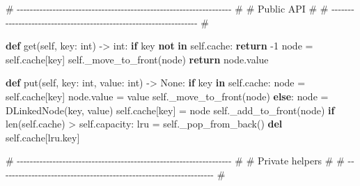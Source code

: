 \documentclass[11pt]{article}
\newenvironment{Shaded}{\begin{snugshade}}{\end{snugshade}}
\newcommand{\BuiltInTok}[1]{\textcolor[rgb]{0.50,0.55,0.55}{#1}}
\newcommand{\CommentTok}[1]{\textcolor[rgb]{0.48,0.49,0.49}{#1}}
\newcommand{\ControlFlowTok}[1]{\textcolor[rgb]{0.99,0.74,0.29}{\textbf{#1}}}
\newcommand{\DecValTok}[1]{\textcolor[rgb]{0.96,0.45,0.00}{#1}}
\newcommand{\KeywordTok}[1]{\textcolor[rgb]{0.81,0.81,0.76}{\textbf{#1}}}
\newcommand{\NormalTok}[1]{\textcolor[rgb]{0.81,0.81,0.76}{#1}}
\newcommand{\OperatorTok}[1]{\textcolor[rgb]{0.81,0.81,0.76}{#1}}
\newcommand{\VariableTok}[1]{\textcolor[rgb]{0.15,0.68,0.68}{#1}}
\begin{document}
\begin{Shaded}
\begin{Highlighting}[]
    \CommentTok{\# {-}{-}{-}{-}{-}{-}{-}{-}{-}{-}{-}{-}{-}{-}{-}{-}{-}{-}{-}{-}{-}{-}{-}{-}{-}{-}{-}{-}{-}{-}{-}{-}{-}{-}{-}{-}{-}{-}{-}{-}{-}{-}{-}{-}{-}{-}{-}{-}{-}{-}{-}{-}{-}{-}{-}{-}{-}{-}{-}{-}{-}{-}{-}{-}{-}{-} \#}
    \CommentTok{\# Public API                                                           \#}
    \CommentTok{\# {-}{-}{-}{-}{-}{-}{-}{-}{-}{-}{-}{-}{-}{-}{-}{-}{-}{-}{-}{-}{-}{-}{-}{-}{-}{-}{-}{-}{-}{-}{-}{-}{-}{-}{-}{-}{-}{-}{-}{-}{-}{-}{-}{-}{-}{-}{-}{-}{-}{-}{-}{-}{-}{-}{-}{-}{-}{-}{-}{-}{-}{-}{-}{-}{-}{-} \#}

    \KeywordTok{def}\NormalTok{ get(}\VariableTok{self}\NormalTok{, key: }\BuiltInTok{int}\NormalTok{) }\OperatorTok{{-}\textgreater{}} \BuiltInTok{int}\NormalTok{:}
        \ControlFlowTok{if}\NormalTok{ key }\KeywordTok{not} \KeywordTok{in} \VariableTok{self}\NormalTok{.cache:}
            \ControlFlowTok{return} \OperatorTok{{-}}\DecValTok{1}
\NormalTok{        node }\OperatorTok{=} \VariableTok{self}\NormalTok{.cache[key]}
        \VariableTok{self}\NormalTok{.\_move\_to\_front(node)}
        \ControlFlowTok{return}\NormalTok{ node.value}

    \KeywordTok{def}\NormalTok{ put(}\VariableTok{self}\NormalTok{, key: }\BuiltInTok{int}\NormalTok{, value: }\BuiltInTok{int}\NormalTok{) }\OperatorTok{{-}\textgreater{}} \VariableTok{None}\NormalTok{:}
        \ControlFlowTok{if}\NormalTok{ key }\KeywordTok{in} \VariableTok{self}\NormalTok{.cache:}
\NormalTok{            node }\OperatorTok{=} \VariableTok{self}\NormalTok{.cache[key]}
\NormalTok{            node.value }\OperatorTok{=}\NormalTok{ value}
            \VariableTok{self}\NormalTok{.\_move\_to\_front(node)}
        \ControlFlowTok{else}\NormalTok{:}
\NormalTok{            node }\OperatorTok{=}\NormalTok{ DLinkedNode(key, value)}
            \VariableTok{self}\NormalTok{.cache[key] }\OperatorTok{=}\NormalTok{ node}
            \VariableTok{self}\NormalTok{.\_add\_to\_front(node)}
            \ControlFlowTok{if} \BuiltInTok{len}\NormalTok{(}\VariableTok{self}\NormalTok{.cache) }\OperatorTok{\textgreater{}} \VariableTok{self}\NormalTok{.capacity:}
\NormalTok{                lru }\OperatorTok{=} \VariableTok{self}\NormalTok{.\_pop\_from\_back()}
                \KeywordTok{del} \VariableTok{self}\NormalTok{.cache[lru.key]}

    \CommentTok{\# {-}{-}{-}{-}{-}{-}{-}{-}{-}{-}{-}{-}{-}{-}{-}{-}{-}{-}{-}{-}{-}{-}{-}{-}{-}{-}{-}{-}{-}{-}{-}{-}{-}{-}{-}{-}{-}{-}{-}{-}{-}{-}{-}{-}{-}{-}{-}{-}{-}{-}{-}{-}{-}{-}{-}{-}{-}{-}{-}{-}{-}{-}{-}{-}{-}{-} \#}
    \CommentTok{\# Private helpers                                                      \#}
    \CommentTok{\# {-}{-}{-}{-}{-}{-}{-}{-}{-}{-}{-}{-}{-}{-}{-}{-}{-}{-}{-}{-}{-}{-}{-}{-}{-}{-}{-}{-}{-}{-}{-}{-}{-}{-}{-}{-}{-}{-}{-}{-}{-}{-}{-}{-}{-}{-}{-}{-}{-}{-}{-}{-}{-}{-}{-}{-}{-}{-}{-}{-}{-}{-}{-}{-}{-}{-} \#}


\end{Highlighting}
\end{Shaded}
\end{document}
